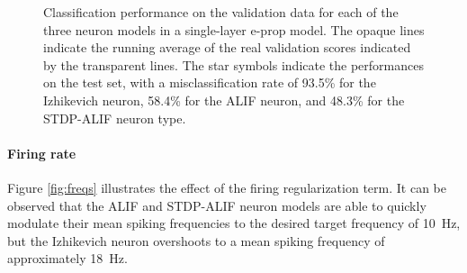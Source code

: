 			\begin{figure}[bth]
			    \myfloatalign
			     \quad
			    \caption[Single-layer classification performance per neuron model]{Classification performance on the validation data for each of the three neuron models in a single-layer e-prop model. The opaque lines indicate the running average of the real validation scores indicated by the transparent lines. The star symbols indicate the performances on the test set, with a misclassification rate of 93.5\% for the Izhikevich neuron, 58.4\% for the ALIF neuron, and 48.3\% for the STDP-ALIF neuron type.}\label{fig:sl-acc}
			\end{figure}

		\paragraph{Firing rate}
			Figure \ref{fig:freqs} illustrates the effect of the firing regularization term.
			It can be observed that the ALIF and STDP-ALIF neuron models are able to quickly modulate their mean spiking frequencies to the desired target frequency of \SI{10}{\Hz}, but the Izhikevich neuron overshoots to a mean spiking frequency of approximately \SI{18}{\Hz}.

